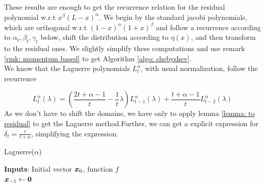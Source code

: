 \documentclass{article}
\begin{document}
\label{jacobi recurrence}
These results are enough to  get  the recurrence relation for the residual polynomial w.r.t $x^\beta(L-x)^\alpha$. We begin by the standard jacobi polynomials, which are orthogonal w.r.t $(1-x)^\alpha(1+x)^\beta$ and follow a recurrence according to $\alpha_t,\beta_t,\gamma_t$ below, shift the distribution according to $\eta(x)$, and then transform to the residual ones. We slightly simplify these computations and use remark \ref{rmk: momentum based} to get Algorithm \ref{algo: chebyshev}. \\

We know \citep{szego1975orthogonal} that the Laguerre polynomials $L_t^\alpha$, with usual normalization, follow the recurrence

\begin{equation}
    L_t^\alpha(\lambda)=\left(\frac{2t+\alpha-1}{t}-\frac{1}{t}\lambda\right)L_{t-1}^\alpha(\lambda)+\frac{t+\alpha-1}{t}L_{t-2}^\alpha(\lambda)
\end{equation}
As we don't have to shift the domains, we have only to apply lemma \ref{lemma: to residual} to get the Laguerre method.Further, we can get a explicit expression for $\delta_t=\frac{t}{t+\alpha}$, simplifying the expression.

\begin{algorithm}
\caption{Laguerre($\alpha$)}
\textbf{Inputs}: Initial vector ${\boldsymbol x}_0$, function $f$ \\
${\boldsymbol x}_{-1}\gets \textbf{0}$\\
\end{algorithm}
\end{document}
